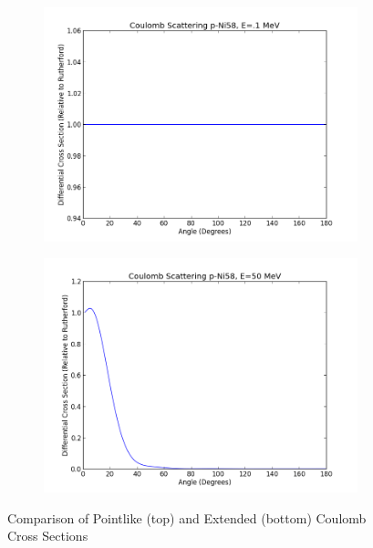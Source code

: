 \documentclass[paper=a4, fontsize=11pt]{scrartcl} %
\numberwithin{equation}{section} %
\numberwithin{figure}{section} %
\numberwithin{table}{section} %
\begin{document}
\begin{figure}[hbt]
\begin{subfigure}[b!]{0.45\textwidth}
        \end{subfigure}
\\
        ~ %
        \begin{subfigure}[b]{0.45\textwidth}
                \includegraphics[width=\textwidth]{Coulombpoint1.png}
        \end{subfigure}
\quad
        \begin{subfigure}[b]{0.45\textwidth}
                \includegraphics[width=\textwidth]{Coulomb50.png}
        \end{subfigure}

        \caption{Comparison of Pointlike (top) and Extended (bottom) Coulomb Cross Sections }
\end{figure}
\end{document}
